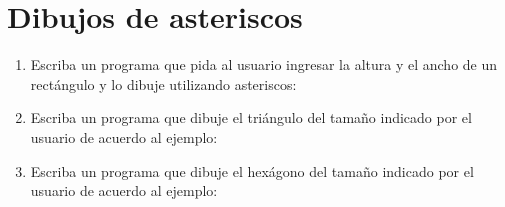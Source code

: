 \section{Dibujos de asteriscos}

\begin{enumerate}
\item
  Escriba un programa que pida al usuario ingresar la altura y el ancho
  de un rectángulo y lo dibuje utilizando asteriscos:
\item
  Escriba un programa que dibuje el triángulo del tamaño indicado por el
  usuario de acuerdo al ejemplo:
\item
  Escriba un programa que dibuje el hexágono del tamaño indicado por el
  usuario de acuerdo al ejemplo:
\end{enumerate}
